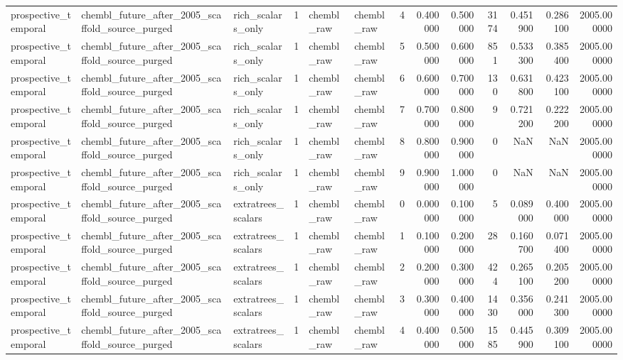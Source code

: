 \begin{longtable}{lllrllrrrrrrr}
prospective\_temporal & chembl\_future\_after\_2005\_scaffold\_source\_purged & rich\_scalars\_only & 1 & chembl\_raw & chembl\_raw & 4 & 0.400000 & 0.500000 & 3174 & 0.451900 & 0.286100 & 2005.000000 \\
prospective\_temporal & chembl\_future\_after\_2005\_scaffold\_source\_purged & rich\_scalars\_only & 1 & chembl\_raw & chembl\_raw & 5 & 0.500000 & 0.600000 & 851 & 0.533300 & 0.385400 & 2005.000000 \\
prospective\_temporal & chembl\_future\_after\_2005\_scaffold\_source\_purged & rich\_scalars\_only & 1 & chembl\_raw & chembl\_raw & 6 & 0.600000 & 0.700000 & 130 & 0.631800 & 0.423100 & 2005.000000 \\
prospective\_temporal & chembl\_future\_after\_2005\_scaffold\_source\_purged & rich\_scalars\_only & 1 & chembl\_raw & chembl\_raw & 7 & 0.700000 & 0.800000 & 9 & 0.721200 & 0.222200 & 2005.000000 \\
prospective\_temporal & chembl\_future\_after\_2005\_scaffold\_source\_purged & rich\_scalars\_only & 1 & chembl\_raw & chembl\_raw & 8 & 0.800000 & 0.900000 & 0 & NaN & NaN & 2005.000000 \\
prospective\_temporal & chembl\_future\_after\_2005\_scaffold\_source\_purged & rich\_scalars\_only & 1 & chembl\_raw & chembl\_raw & 9 & 0.900000 & 1.000000 & 0 & NaN & NaN & 2005.000000 \\
prospective\_temporal & chembl\_future\_after\_2005\_scaffold\_source\_purged & extratrees\_scalars & 1 & chembl\_raw & chembl\_raw & 0 & 0.000000 & 0.100000 & 5 & 0.089000 & 0.400000 & 2005.000000 \\
prospective\_temporal & chembl\_future\_after\_2005\_scaffold\_source\_purged & extratrees\_scalars & 1 & chembl\_raw & chembl\_raw & 1 & 0.100000 & 0.200000 & 28 & 0.160700 & 0.071400 & 2005.000000 \\
prospective\_temporal & chembl\_future\_after\_2005\_scaffold\_source\_purged & extratrees\_scalars & 1 & chembl\_raw & chembl\_raw & 2 & 0.200000 & 0.300000 & 424 & 0.265100 & 0.205200 & 2005.000000 \\
prospective\_temporal & chembl\_future\_after\_2005\_scaffold\_source\_purged & extratrees\_scalars & 1 & chembl\_raw & chembl\_raw & 3 & 0.300000 & 0.400000 & 1430 & 0.356000 & 0.241300 & 2005.000000 \\
prospective\_temporal & chembl\_future\_after\_2005\_scaffold\_source\_purged & extratrees\_scalars & 1 & chembl\_raw & chembl\_raw & 4 & 0.400000 & 0.500000 & 1585 & 0.445900 & 0.309100 & 2005.000000 \\

\end{longtable}
